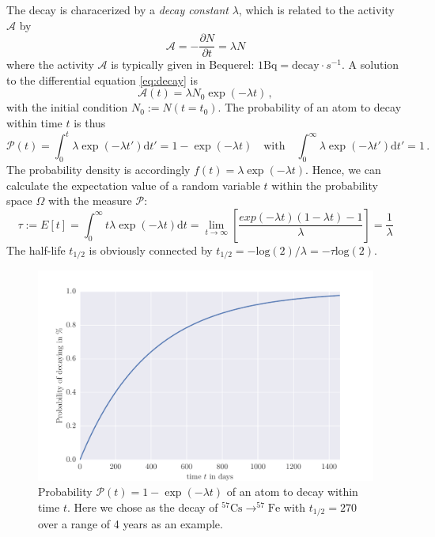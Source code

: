 The decay is characerized by a \emph{decay constant} $\lambda$, which is related to the activity $\mathcal{A}$
by 
\begin{equation}\label{eq:decay}
    \mathcal{A} = -\frac{\partial N}{\partial t} = \lambda N 
\end{equation}
where the activity $\mathcal{A}$ is typically given in Bequerel: $1 \textrm{Bq}= \textrm{decay}\cdot s^{-1}$.
A solution to the differential equation \eqref{eq:decay} is
\begin{equation}
    \mathcal{A}(t) = \lambda N_0 \exp(-\lambda t) \, ,
\end{equation}
with the initial condition $N_0 := N(t=t_0)$. 
The probability of an atom to decay within time $t$ is thus
\begin{equation}
    \mathcal{P}(t) = \int_{0}^{t}\lambda \exp(-\lambda t')\mathrm{d}t' = 1 -  \exp(-\lambda t)  \quad
    \textrm{with} \quad \int_{0}^{\infty}\lambda \exp(-\lambda t')\mathrm{d}t' = 1 \, .
\end{equation}
The probability density is accordingly $f(t) = \lambda \exp(-\lambda t)$. 
Hence, we can calculate the expectation value of a random variable $t$ within the probability space
$\Omega$ with the measure  $\mathcal{P}$:
\begin{equation}
    \tau := E[t] = \int_{0}^{\infty} t \lambda \exp(-\lambda t) \mathrm{d}t 
    =\lim_{t \rightarrow \infty}\left[ \frac{exp(-\lambda t) (1-\lambda t) - 1 }{\lambda} \right] 
= \frac{1}{\lambda}
\end{equation}
The half-life $t_{1/2}$ is obviously connected by $t_{1/2}= -\mathrm{log}(2)/ \lambda = - \tau \mathrm{log}(2)$.
\begin{figure}[htpb]
    \centering
    \includegraphics[width=0.9\linewidth]{analysis/figures/halflife}
    \caption{Probability $\mathcal{P}(t) = 1 -  \exp(-\lambda t)$ of an atom to decay within time $t$.
        Here we chose as the decay of
        $^{57}\textrm{Cs}\rightarrow ^{57}\textrm{Fe}$ with $t_{1/2}=270$ over a range
    of 4 years as an example.}
    \label{fig:decay}
\end{figure}
\clearpage

